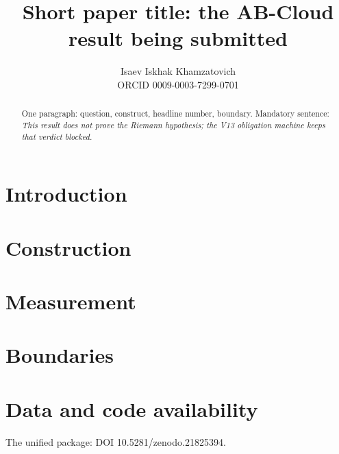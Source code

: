 \documentclass[11pt,a4paper]{article}
\title{Short paper title: the AB-Cloud result being submitted}
\author{Isaev Iskhak Khamzatovich\\ ORCID 0009-0003-7299-0701}
\begin{document}
\maketitle
\begin{abstract}
One paragraph: question, construct, headline number, boundary.
Mandatory sentence: \emph{This result does not prove the Riemann hypothesis;
the V13 obligation machine keeps that verdict blocked.}
\end{abstract}
\section{Introduction}
\section{Construction}
\section{Measurement}
\section{Boundaries}
\section{Data and code availability}
The unified package: DOI 10.5281/zenodo.21825394.


\end{document}
